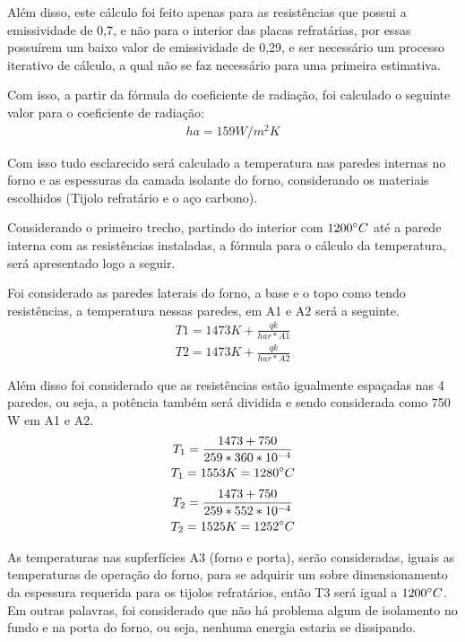 Além disso, este cálculo foi feito apenas para as resistências que possui a emissividade de 0,7, e não para o interior das placas refratárias, por essas possuírem um baixo valor de emissividade de 0,29, e ser necessário um processo iterativo de cálculo, a qual não se faz necessário para uma primeira estimativa.

Com isso, a partir da fórmula do coeficiente de radiação, foi calculado o seguinte valor para o coeficiente de radiação:
\begin{gather}
	ha = 159W/m^{2}K \nonumber
\end{gather}

Com isso tudo esclarecido será calculado a temperatura nas paredes internas no forno e as espessuras da camada isolante do forno, considerando os materiais escolhidos (Tijolo refratário e o aço carbono).

Considerando o primeiro trecho, partindo do interior com $1200 \degree C$ até a parede interna com as resistências instaladas, a fórmula para o cálculo da temperatura, será apresentado logo a seguir.

Foi considerado as paredes laterais do forno, a base e o topo como tendo resistências, a temperatura nessas paredes, em A1 e A2 será a seguinte.
\begin{gather}
	T1 = 1473K + \frac{qk}{har*A1} \nonumber \\
	T2 = 1473K + \frac{qk}{har*A2} \nonumber
\end{gather}

Além disso foi considerado que as resistências estão igualmente espaçadas nas 4 paredes, ou seja, a potência também será dividida e sendo considerada como 750 W em A1 e A2.
\begin{gather}
	T_1 = \frac{1473 + 750} {259*360*10^{-4}} \nonumber \\
	T_1 = 1553K = 1280 \degree C \nonumber
    \nonumber
\end{gather}
\begin{gather}
    T_2 = \frac{1473 + 750} {259   *552*10^{-4}} \nonumber \\
	T_2 = 1525K = 1252 \degree C \nonumber
\end{gather}

As temperaturas nas supferfícies A3 (forno e porta), serão consideradas, iguais as temperaturas de operação do forno, para se adquirir um sobre dimensionamento da espessura requerida para os tijolos refratários, então T3 será igual a $1200 \degree C$. Em outras palavras, foi considerado que não há problema algum de isolamento no fundo e na porta do forno, ou seja, nenhuma energia estaria se dissipando.

